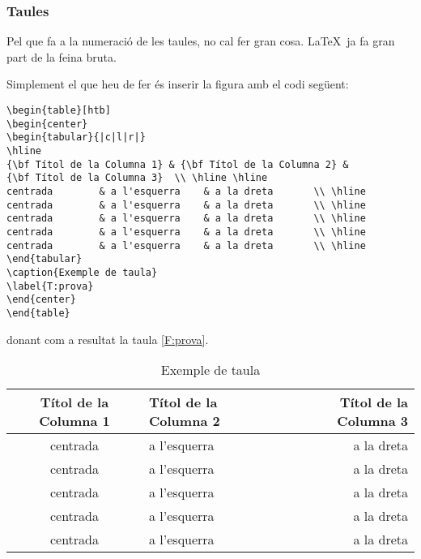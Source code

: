 \subsubsection{Taules}

Pel que fa a la numeració de les taules, no cal fer gran cosa. \LaTeX \ ja fa gran part de la feina bruta. 

Simplement el que heu de fer és inserir la figura amb el codi següent:

\begin{verbatim}
\begin{table}[htb]
\begin{center}
\begin{tabular}{|c|l|r|}
\hline
{\bf Títol de la Columna 1} & {\bf Títol de la Columna 2} & 
{\bf Títol de la Columna 3}  \\ \hline \hline
centrada        & a l'esquerra    & a la dreta       \\ \hline
centrada        & a l'esquerra    & a la dreta       \\ \hline
centrada        & a l'esquerra    & a la dreta       \\ \hline
centrada        & a l'esquerra    & a la dreta       \\ \hline
centrada        & a l'esquerra    & a la dreta       \\ \hline
\end{tabular}
\caption{Exemple de taula}
\label{T:prova}
\end{center}
\end{table}
\end{verbatim}

donant com a resultat la taula \ref{F:prova}.


\begin{table}[htb]
\begin{center}
\begin{tabular}{|c|l|r|}
\hline
{\bf Títol de la Columna 1} & {\bf Títol de la Columna 2} & {\bf Títol de la Columna 3}  \\ \hline \hline
centrada        & a l'esquerra    & a la dreta       \\ \hline
centrada        & a l'esquerra    & a la dreta       \\ \hline
centrada        & a l'esquerra    & a la dreta       \\ \hline
centrada        & a l'esquerra    & a la dreta       \\ \hline
centrada        & a l'esquerra    & a la dreta       \\ \hline
\end{tabular}
\caption{Exemple de taula}
\label{T:prova}
\end{center}
\end{table}


